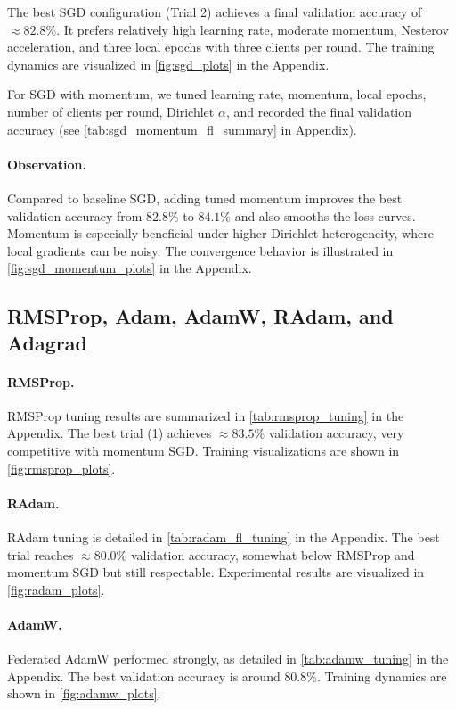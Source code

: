 \documentclass[10pt,twocolumn,letterpaper]{article}
\begin{document}
    The best SGD configuration (Trial 2) achieves a final validation
    accuracy of $\approx 82.8\%$.
    It prefers relatively high learning rate, moderate momentum, Nesterov
    acceleration, and three local epochs with three clients per round.
    The training dynamics are visualized in \cref{fig:sgd_plots} in the Appendix.

    For SGD with momentum, we tuned learning rate, momentum, local epochs,
    number of clients per round, Dirichlet $\alpha$, and recorded the final
    validation accuracy (see \cref{tab:sgd_momentum_fl_summary} in Appendix).

    \paragraph{Observation.}
    Compared to baseline SGD, adding tuned momentum improves the best
    validation accuracy from $82.8\%$ to $84.1\%$ and also smooths the loss
    curves.
    Momentum is especially beneficial under higher Dirichlet heterogeneity,
    where local gradients can be noisy.
    The convergence behavior is illustrated in \cref{fig:sgd_momentum_plots} in the Appendix.

    \subsection{RMSProp, Adam, AdamW, RAdam, and Adagrad}

    \paragraph{RMSProp.}
    RMSProp tuning results are summarized in \cref{tab:rmsprop_tuning} in the Appendix.
    The best trial (1) achieves $\approx 83.5\%$ validation accuracy, very
    competitive with momentum SGD.
    Training visualizations are shown in \cref{fig:rmsprop_plots}.

    \paragraph{RAdam.}
    RAdam tuning is detailed in \cref{tab:radam_fl_tuning} in the Appendix.
    The best trial reaches $\approx 80.0\%$ validation accuracy, somewhat
    below RMSProp and momentum SGD but still respectable.
    Experimental results are visualized in \cref{fig:radam_plots}.

    \paragraph{AdamW.}
    Federated AdamW performed strongly, as detailed in
    \cref{tab:adamw_tuning} in the Appendix.
    The best validation accuracy is around $80.8\%$.
    Training dynamics are shown in \cref{fig:adamw_plots}.
\end{document}
